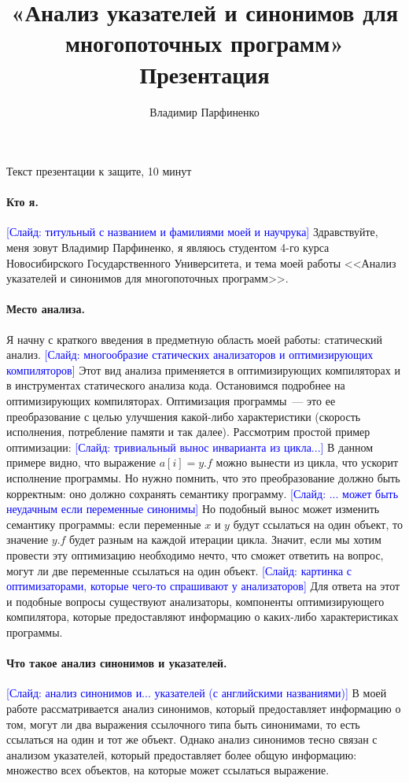 \documentclass[12pt]{article}
\title{
  «Анализ указателей и синонимов для многопоточных программ»\\
  Презентация
}
\author{
  Владимир Парфиненко
}
\newcommand{\slide}[1]{\textcolor{Blue}{[Слайд: #1]}}
\begin{document}
  {\Large Текст презентации к защите, 10 минут}
  \vspace{5mm}

  \paragraph{Кто я.}
  \slide{титульный с названием и фамилиями моей и научрука}
  Здравствуйте, меня зовут Владимир Парфиненко, я являюсь студентом 4-го
  курса Новосибирского Государственного Университета, и тема моей работы
  <<Анализ указателей и синонимов для многопоточных программ>>.

  \paragraph{Место анализа.}
  Я начну с краткого введения в предметную область моей работы: статический
  анализ.
  \slide{многообразие статических анализаторов и оптимизирующих компиляторов}
  Этот вид анализа применяется в оптимизирующих компиляторах и в инструментах
  статического анализа кода.  Остановимся подробнее на оптимизирующих
  компиляторах.
  Оптимизация программы~--- это ее преобразование с целью улучшения какой-либо
  характеристики (скорость исполнения, потребление памяти и так далее).
  Рассмотрим простой пример оптимизации:
  \slide{тривиальный вынос инварианта из цикла...}
  В данном примере видно, что выражение $a[i] = y.f$ можно вынести из цикла,
  что ускорит исполнение программы. Но нужно помнить, что это преобразование
  должно быть корректным: оно должно сохранять семантику программу.
  \slide{... может быть неудачным если переменные синонимы}
  Но подобный вынос может
  изменить семантику программы: если переменные $x$ и $y$ будут ссылаться на
  один объект, то значение $y.f$ будет разным на каждой итерации цикла.
  Значит, если мы хотим провести эту оптимизацию необходимо нечто, что
  сможет ответить на вопрос, могут ли две переменные ссылаться на один объект.
  \slide{картинка с оптимизаторами, которые чего-то спрашивают у анализаторов}
  Для ответа на этот и подобные вопросы существуют
  анализаторы, компоненты оптимизирующего компилятора, которые предоставляют
  информацию о каких-либо характеристиках программы.

  \paragraph{Что такое анализ синонимов и указателей.}
  \slide{анализ синонимов и... указателей (с английскими названиями)}
  В моей работе рассматривается анализ синонимов, который предоставляет
  информацию о том, могут ли два выражения ссылочного типа быть синонимами, то
  есть ссылаться на один и тот же объект. Однако анализ синонимов тесно связан
  с анализом указателей, который предоставляет более общую информацию:
  множество всех объектов, на которые может ссылаться выражение.
\end{document}
